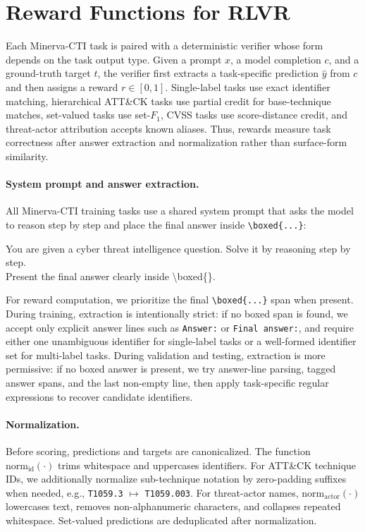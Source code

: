 \section{Reward Functions for RLVR}
\label{sec:minerva-rewards}

Each Minerva-CTI task is paired with a deterministic verifier whose form depends on the task output type. Given a prompt $x$, a model completion $c$, and a ground-truth target $t$, the verifier first extracts a task-specific prediction $\hat{y}$ from $c$ and then assigns a reward $r\in[0,1]$. Single-label tasks use exact identifier matching, hierarchical ATT\&CK tasks use partial credit for base-technique matches, set-valued tasks use set-$F_1$, CVSS tasks use score-distance credit, and threat-actor attribution accepts known aliases. Thus, rewards measure task correctness after answer extraction and normalization rather than surface-form similarity.

\paragraph{System prompt and answer extraction.}
All Minerva-CTI training tasks use a shared system prompt that asks the model to reason step by step and place the final answer inside \verb|\boxed{...}|:

\begin{tcolorbox}[title=Train System Prompt]
You are given a cyber threat intelligence question. Solve it by reasoning step by step.\\
Present the final answer clearly inside \textbackslash boxed\{\}.
\end{tcolorbox}

For reward computation, we prioritize the final \verb|\boxed{...}| span when present. During training, extraction is intentionally strict: if no boxed span is found, we accept only explicit answer lines such as \texttt{Answer:} or \texttt{Final answer:}, and require either one unambiguous identifier for single-label tasks or a well-formed identifier set for multi-label tasks. During validation and testing, extraction is more permissive: if no boxed answer is present, we try answer-line parsing, tagged answer spans, and the last non-empty line, then apply task-specific regular expressions to recover candidate identifiers.

\paragraph{Normalization.}
Before scoring, predictions and targets are canonicalized. The function $\mathrm{norm}_{\mathrm{id}}(\cdot)$ trims whitespace and uppercases identifiers. For ATT\&CK technique IDs, we additionally normalize sub-technique notation by zero-padding suffixes when needed, e.g., \texttt{T1059.3} $\mapsto$ \texttt{T1059.003}. For threat-actor names, $\mathrm{norm}_{\mathrm{actor}}(\cdot)$ lowercases text, removes non-alphanumeric characters, and collapses repeated whitespace. Set-valued predictions are deduplicated after normalization.

